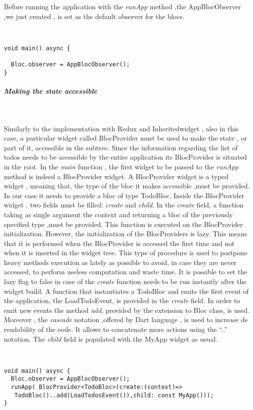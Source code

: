 Before running the application with the \textit{runApp} method ,the AppBlocObserver ,we just created , is set as the default observer for the blocs.

\begin{code}
\mbox{}\\
 \mbox{}
\label{code:2.14}
\begin{verbatim}
void main() async {

  Bloc.observer = AppBlocObserver();
}
\end{verbatim}
\mbox{}
\end{code}
\subparagraph{Making the state accessible}\mbox{}\\
\label{subpar:todo_app_bloc_core_state}

Similarly to the implementation with Redux and Inheritedwidget , also in this case, a particular widget called BlocProvider must be used to make the state , or part of it, accessible in the subtree. Since the information regarding the list of todos needs to be accessible by the entire application its BlocProvider is situated in the root. In the \textit{main} function , the first widget to be passed to the \textit{runApp} method is indeed a BlocProvider widget. A BlocProvider widget is a typed widget , meaning that, the type of the bloc it makes accessible ,must be provided. In our case it needs to provide a bloc of type TodoBloc. Inside the BlocProvider widget , two fields must  be filled: \textit{create} and \textit{child}. In the \textit{create} field, a function taking as single argument the context and returning a bloc of the previously specified type ,must be provided. This function is executed on the BlocProvider initialization. However, the initialization of the BlocProviders is lazy. This means that it is performed when the BlocProvider is accessed the first time and not when it is inserted in the widget tree. This type of procedure is used to postpone heavy methods execution as lately as possible to avoid, in case they are never accessed, to perform useless computation and waste time. It is possible to set the lazy flag to false in case of the \textit{create} function needs to be run instantly after the widget build. A function that instantiates a TodoBloc and emits the first event of the application, the LoadTodoEvent, is provided in the \textit{create} field. In order to emit new events the method \textit{add}, provided by the extension to Bloc class, is used. Moreover , the \textit{cascade} notation ,offered by Dart language , is used to increase de readability of the code. It allows to concatenate more actions using the  “..” notation.
The \textit{child} field is populated with the MyApp widget as usual.
\begin{code}
\mbox{}\\
 \mbox{}
\label{code:2.14}
\begin{verbatim}
void main() async {
  Bloc.observer = AppBlocObserver();
  runApp( BlocProvider<TodoBloc>(create:(context)=>
   TodoBloc()..add(LoadTodosEvent()),child: const MyApp()));
}
\end{verbatim}
\mbox{}
\end{code}

